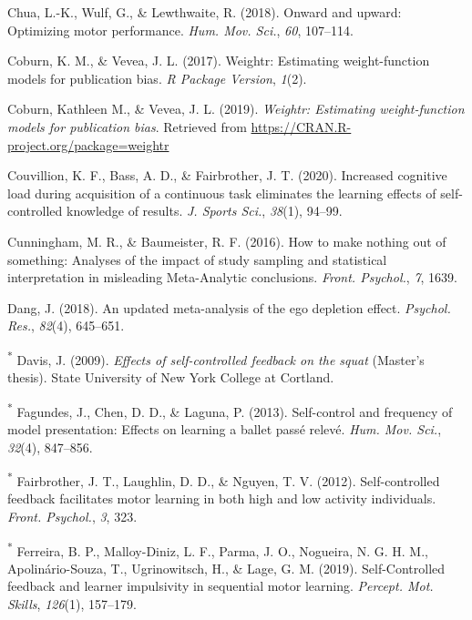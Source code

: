 \documentclass[
  english,
  man,floatsintext]{apa7}
\newlength{\cslhangindent}
\newlength{\cslentryspacingunit} %
\newenvironment{CSLReferences}[2] %
 {%
  \setlength{\parindent}{0pt}
  \ifodd #1
  \let\oldpar\par
  \def\par{\hangindent=\cslhangindent\oldpar}
  \fi
  \setlength{\parskip}{#2\cslentryspacingunit}
 }%
 {}
\begin{document}
\begin{CSLReferences}{1}{0}
\leavevmode{}%
Chua, L.-K., Wulf, G., \& Lewthwaite, R. (2018). Onward and upward: Optimizing motor performance. \emph{Hum. Mov. Sci.}, \emph{60}, 107--114.

\leavevmode{}%
Coburn, K. M., \& Vevea, J. L. (2017). Weightr: Estimating weight-function models for publication bias. \emph{R Package Version}, \emph{1}(2).

\leavevmode{}%
Coburn, Kathleen M., \& Vevea, J. L. (2019). \emph{Weightr: Estimating weight-function models for publication bias}. Retrieved from \url{https://CRAN.R-project.org/package=weightr}

\leavevmode{}%
Couvillion, K. F., Bass, A. D., \& Fairbrother, J. T. (2020). Increased cognitive load during acquisition of a continuous task eliminates the learning effects of self-controlled knowledge of results. \emph{J. Sports Sci.}, \emph{38}(1), 94--99.

\leavevmode{}%
Cunningham, M. R., \& Baumeister, R. F. (2016). How to make nothing out of something: Analyses of the impact of study sampling and statistical interpretation in misleading {Meta-Analytic} conclusions. \emph{Front. Psychol.}, \emph{7}, 1639.

\leavevmode{}%
Dang, J. (2018). An updated meta-analysis of the ego depletion effect. \emph{Psychol. Res.}, \emph{82}(4), 645--651.

\leavevmode{}%
\textsuperscript{*} Davis, J. (2009). \emph{Effects of self-controlled feedback on the squat} (Master's thesis). State University of New York College at Cortland.

\leavevmode{}%
\textsuperscript{*} Fagundes, J., Chen, D. D., \& Laguna, P. (2013). Self-control and frequency of model presentation: Effects on learning a ballet pass{é} relev{é}. \emph{Hum. Mov. Sci.}, \emph{32}(4), 847--856.

\leavevmode{}%
\textsuperscript{*} Fairbrother, J. T., Laughlin, D. D., \& Nguyen, T. V. (2012). Self-controlled feedback facilitates motor learning in both high and low activity individuals. \emph{Front. Psychol.}, \emph{3}, 323.

\leavevmode{}%
\textsuperscript{*} Ferreira, B. P., Malloy-Diniz, L. F., Parma, J. O., Nogueira, N. G. H. M., Apolinário-Souza, T., Ugrinowitsch, H., \& Lage, G. M. (2019). {Self-Controlled} feedback and learner impulsivity in sequential motor learning. \emph{Percept. Mot. Skills}, \emph{126}(1), 157--179.


\end{CSLReferences}
\end{document}
